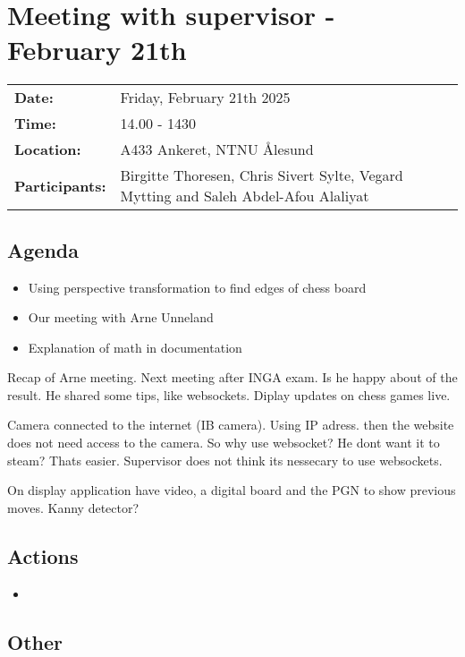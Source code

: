 \section{Meeting with supervisor - February 21th}
\begin{tabular}{ll}
    \textbf{Date:} & Friday, February 21th 2025 \\
    \textbf{Time:} & 14.00 - 1430\\
    \textbf{Location:} & A433 Ankeret, NTNU Ålesund \\
    \textbf{Participants:} & Birgitte Thoresen, Chris Sivert Sylte, Vegard Mytting and Saleh Abdel-Afou Alaliyat\\
\end{tabular}

\vspace{0.5cm}

\subsection{Agenda}

\begin{itemize}
    \item Using perspective transformation to find edges of chess board
    \item Our meeting with Arne Unneland
    \item Explanation of math in documentation
\end{itemize}

Recap of Arne meeting. Next meeting after INGA exam. Is he happy about of the result. He shared some tips, like websockets. Diplay updates on chess games live. 

Camera connected to the internet (IB camera). Using IP adress. then the website does not need access to the camera. So why use websocket? He dont want it to steam? Thats easier. Supervisor does not think its nessecary to use websockets. 

On display application have video, a digital board and the PGN to show previous moves. Kanny detector?

\subsection{Actions}
\begin{itemize}
    \item 
\end{itemize}

\subsection{Other}
